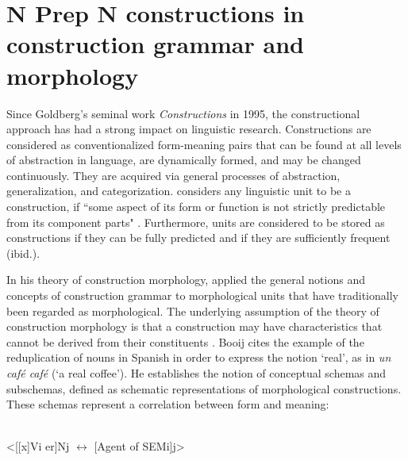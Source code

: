 \documentclass[output=paper]{langsci/langscibook}
\begin{document}
\section{N Prep N constructions in construction grammar and morphology}
Since Goldberg’s seminal work \textit{Constructions} in 1995, the constructional approach has had a strong impact on linguistic research. Constructions are considered as conventionalized form-meaning pairs that can be found at all levels of abstraction in language, are dynamically formed, and may be changed continuously. They are acquired via general processes of abstraction, generalization, and categorization. \citet{Goldberg:2006} considers any linguistic unit to be a construction, if ``some aspect of its form or function is not strictly predictable from its component parts" \citep[5]{Goldberg:2006}. Furthermore, units are considered to be stored as constructions if they can be fully predicted and if they are sufficiently frequent (ibid.).

In his theory of construction morphology, \citet{Booij:2015} applied the general notions and concepts of construction grammar to morphological units that have traditionally been regarded as morphological. The underlying assumption of the theory of construction morphology is that a construction may have characteristics that cannot be derived from their constituents \citep[3]{Booij:2015}. Booij cites the example of the reduplication of nouns in Spanish in order to express the notion `real', as in \textit{un café café} (`a real coffee'). He establishes the notion of conceptual schemas and subschemas, defined as schematic representations of morphological constructions. These schemas represent a correlation between form and meaning:

\ea\citep[2]{Booij:2015}\\ <[[x]Vi er]Nj $\leftrightarrow$ [Agent of SEMi]j>\z
\end{document}
